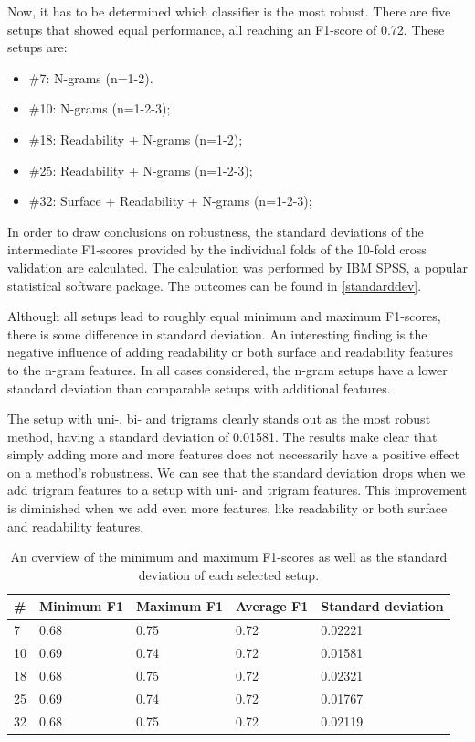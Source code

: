 \documentclass[
10pt, %
a4paper, %
oneside, %
headinclude,footinclude, %
] {book}%
\begin{document}
Now, it has to be determined which classifier is the most robust. There are five setups that showed equal performance, all reaching an F1-score of 0.72. These setups are:
\begin{itemize}
\item \#7: N-grams (n=1-2).
\item \#10: N-grams (n=1-2-3);
\item \#18: Readability + N-grams (n=1-2);
\item \#25: Readability + N-grams (n=1-2-3);
\item \#32: Surface + Readability + N-grams (n=1-2-3);
\end{itemize}

In order to draw conclusions on robustness, the standard deviations of the intermediate F1-scores provided by the individual folds of the 10-fold cross validation are calculated. The calculation was performed by IBM SPSS, a popular statistical software package. The outcomes can be found in \autoref{standarddev}.

Although all setups lead to roughly equal minimum and maximum F1-scores, there is some difference in standard deviation. An interesting finding is the negative influence of adding readability or both surface and readability features to the n-gram features. In all cases considered, the n-gram setups have a lower standard deviation than comparable setups with additional features.

The setup with uni-, bi- and trigrams clearly stands out as the most robust method, having a standard deviation of 0.01581. The results make clear that simply adding more and more features does not necessarily have a positive effect on a method's robustness. We can see that the standard deviation drops when we add trigram features to a setup with uni- and trigram features. This improvement is diminished when we add even more features, like readability or both surface and readability features. 


\begin{table}[]
\caption{An overview of the minimum and maximum F1-scores as well as the standard deviation of each selected setup.}
\label{standarddev}
\begin{tabular}{@{}lllll@{}}
\toprule
\textbf{\#} & \textbf{Minimum F1} & \textbf{Maximum F1} & \textbf{Average F1} & \textbf{Standard deviation} \\ \midrule
7                    & 0.68             & 0.75             & 0.72             & 0.02221                     \\
10                   & 0.69             & 0.74             & 0.72             & 0.01581                     \\
18                   & 0.68             & 0.75             & 0.72             & 0.02321                    \\
25                   & 0.69             & 0.74             & 0.72             & 0.01767                     \\
32                   & 0.68             & 0.75             & 0.72             & 0.02119                     \\ \bottomrule
\end{tabular}
\end{table}
\end{document}
